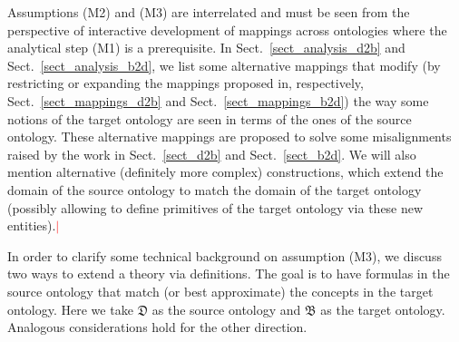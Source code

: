 \documentclass[ao]{iosart2x}
\newcommand{\nb}[1]{\textcolor{red}{$|$}\marginpar{\hspace*{-0cm}\parbox{20mm}{\scriptsize\raggedright\textcolor{red}{#1}}}}
\newcommand{\pr}[1]{\mathtt{#1}}
\newcommand{\cn}[1]{\mathtt{#1}}
\newcommand{\dolce}{{\textsc{dolce}}}
\newcommand{\bfo}{{\textsc{bfo}}}
\newcommand {\thdolce} {\ensuremath{\mathfrak{D}}}
\newcommand {\thbfo} {\ensuremath{\mathfrak{B}}}
\newcommand {\EDdcat} {\textsc{ed}}
\newcommand {\PDdcat} {\textsc{pd}}
\newcommand {\TPd} {\ensuremath{\pr{tP}}}
\newcommand {\Pd} {\ensuremath{\pr{P}}}
\newcommand{\cntbcat}{\cn{cnt}}
\newcommand{\occbcat}{\cn{occ}}
\newcommand{\bfocpart}{\pr{cP}}
\newcommand{\bfoopart}{\pr{oP}}
\begin{document}
Assumptions (M2) and (M3) are interrelated and must be seen from the perspective of interactive development of mappings across ontologies where the analytical step (M1) is a prerequisite. In Sect.~\ref{sect_analysis_d2b} and Sect.~\ref{sect_analysis_b2d}, we list some alternative mappings that modify (by restricting or expanding the mappings proposed in, respectively, Sect.~\ref{sect_mappings_d2b} and Sect.~\ref{sect_mappings_b2d}) the way some notions of the target ontology are seen in terms of the ones of the source ontology. These alternative mappings are proposed to solve some misalignments raised by the work in Sect.~\ref{sect_d2b} and Sect.~\ref{sect_b2d}. We will also mention alternative (definitely more complex) constructions, which extend the domain of the source ontology to match the domain of the target ontology (possibly allowing to define primitives of the target ontology via these new entities).\nb{CM: qui cosa volevamo dire? [FC: non ne ho idea, forse fa riferimento a quando nel testo parli di introdurre e.g. coppie di cose. Io taglierei frase]} 
 

In order to clarify some technical background on assumption (M3), we discuss two ways to extend a theory via definitions. The goal is to have formulas in the source ontology that match (or best approximate) the concepts in the target ontology. Here we take {$\thdolce$} as the source ontology and {$\thbfo$} as the target ontology. Analogous considerations hold for the other direction.
\end{document}
